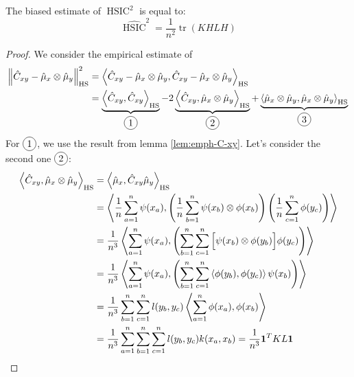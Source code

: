 \begin{proposition}
    The biased estimate of $\operatorname{HSIC}^2$ is equal to:
    \begin{equation*}
        \widehat{\operatorname{HSIC}}^2 = \frac{1}{n^2}\operatorname{tr}(KHLH)
    \end{equation*}
\end{proposition}
\begin{proof}
    We consider the empirical estimate of 
    \begin{equation*}
    \begin{aligned}
        \norm{ \hat{C}_{xy} - \hat{\mu}_x\otimes\hat{\mu}_y}_{\operatorname{HS}}^2 &= \brackd{\hat{C}_{xy} - \hat{\mu}_x\otimes\hat{\mu}_y, \hat{C}_{xy} - \hat{\mu}_x\otimes\hat{\mu}_y}_{\operatorname{HS}} \\
        &= \underbrace{\brackd{\hat{C}_{xy}, \hat{C}_{xy}}_{\operatorname{HS}}}_{\circled{1}} - 2\underbrace{\brackd{\hat{C}_{xy}, \hat{\mu}_x\otimes\hat{\mu}_y}_{\operatorname{HS}}}_{\circled{2}}  + \underbrace{\brackd{\hat{\mu}_x\otimes\hat{\mu}_y, \hat{\mu}_x\otimes\hat{\mu}_y}_{\operatorname{HS}}}_{\circled{3}} 
    \end{aligned}
    \end{equation*}
    For $\circled{1}$, we use the result from lemma \ref{lem:emph-C-xy}. Let's consider the second one $\circled{2}$:
    \begin{equation*}
    \begin{aligned}
        \brackd{\hat{C}_{xy}, \hat{\mu}_x\otimes\hat{\mu}_y}_{\operatorname{HS}} &= \brackd{\hat{\mu}_x, \hat{C}_{xy}\hat{\mu}_y}_{\operatorname{HS}}\\ 
        &= \brackd{\frac{1}{n}\sum^n_{a=1} \psi(x_a), \bracka{\frac{1}{n}\sum^n_{b=1} \psi(x_b)\otimes\phi(x_b) }\bracka{\frac{1}{n}\sum^n_{c=1}\phi(y_c)}  } \\
        &= \frac{1}{n^3}\brackd{\sum^n_{a=1} \psi(x_a), \bracka{\sum^n_{b=1}\sum^n_{c=1} \Big[\psi(x_b)\otimes\phi(y_b)\Big]\phi(y_c)}  } \\
        &= \frac{1}{n^3}\brackd{\sum^n_{a=1} \psi(x_a), \bracka{\sum^n_{b=1}\sum^n_{c=1}  \brackd{\phi(y_b), \phi(y_c)}\psi(x_b)}  } \\
        &= \frac{1}{n^3}\sum^n_{b=1}\sum^n_{c=1}l(y_b, y_c)\brackd{\sum^n_{a=1}\phi(x_a), \phi(x_b)} \\
        &= \frac{1}{n^3}\sum^n_{a=1}\sum^n_{b=1}\sum^n_{c=1}l(y_b, y_c)k(x_a, x_b) = \frac{1}{n^3} \boldsymbol 1^T KL\boldsymbol 1
    \end{aligned}

\end{equation*}
\end{proof}
